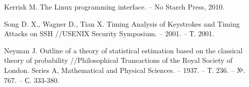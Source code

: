 \begin{thebibliography}{00}
  Kerrisk M. The Linux programming interface. – No Starch Press, 2010.

  Song D. X., Wagner D., Tian X. Timing Analysis of Keystrokes and Timing Attacks on SSH //USENIX Security Symposium. – 2001. – Т. 2001. 

  Neyman J. Outline of a theory of statistical estimation based on the classical theory of probability //Philosophical Transactions of the Royal Society of London. Series A, Mathematical and Physical Sciences. – 1937. – Т. 236. – №. 767. – С. 333-380.

\end{thebibliography}
\endgroup

\clearpage
